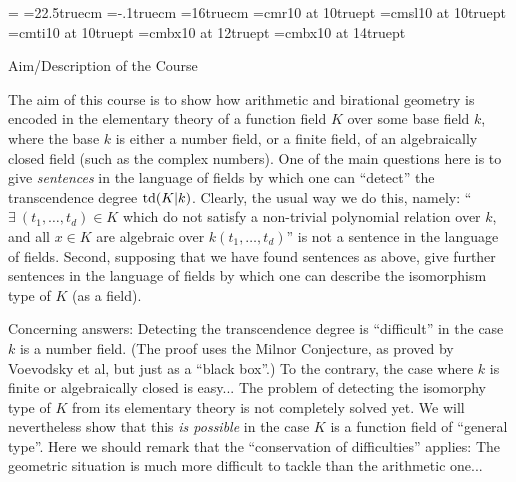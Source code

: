 \magnification=\magstephalf
\vsize=22.5truecm
\voffset=-.1truecm
\hsize=16truecm
\mathsurround=1.75pt
\baselineskip=13.5pt
\nopagenumbers
\font\maimicrm=cmr10 at 10truept
\font\maimicsl=cmsl10 at 10truept
\font\maimicit=cmti10 at 10truept
\font\marebf=cmbx10 at 12truept
\font\maimarebf=cmbx10 at 14truept
\def\hhb#1{\hbox to#1pt{}}  \def\hhh{\hhb{1}}
\def\pn{\par\noindent} \def\ssn{\smallskip\noindent}
\def\msn{\medskip\noindent} \def\bsn{\bigskip\noindent}

\ssn
{\maimarebf Aim/Description of the Course}

\msn
The aim of this course is to show how arithmetic and
birational geometry is encoded in the elementary theory
of a function field $K$ over some base field $k$, where
the base $k$ is either a number field, or a finite field,
of an algebraically closed field (such as the complex
numbers). One of the main questions here is to give 
{\it sentences\/} in the language of fields by which 
one can ``detect'' the transcendence degree ${\rm td}(K|k)$. 
Clearly, the usual way we do this, namely: 
``$\exists\>(t_1,\dots,t_d)\in K$ which do not satisfy
a non-trivial polynomial relation over $k$, and all $x\in K$ 
are algebraic over $k(t_1,\dots,t_d)$'' is not a sentence 
in the language of fields. Second, supposing that we have 
found sentences as above, give further sentences in the 
language of fields by which one can describe the isomorphism 
type of $K$ (as a field). 

\ssn
Concerning answers: Detecting the transcendence degree 
is ``difficult'' in the case $k$ is a number field. (The 
proof uses the Milnor Conjecture, as proved by Voevodsky 
et al, but just as a ``black box''.) To the contrary, the 
case where $k$ is finite or algebraically closed is easy... 
The problem of detecting the isomorphy type of $K$ from 
its elementary theory is not completely solved yet. We 
will nevertheless show that this {\it is possible\/} in 
the case $K$ is a function field of ``general type''. 
Here we should remark that the ``conservation of 
difficulties'' applies: The geometric situation is much 
more difficult to tackle than the arithmetic one...

